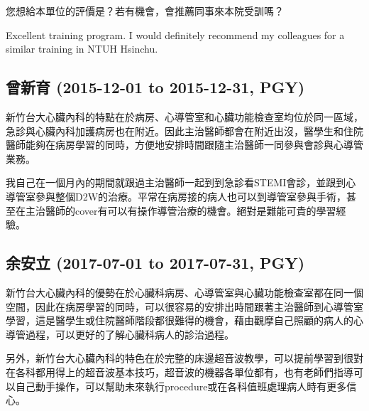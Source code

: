 \documentclass[12pt,a4paper]{article}
\begin{document}
您想給本單位的評價是？若有機會，會推薦同事來本院受訓嗎？

Excellent training program. I would definitely recommend my colleagues for a similar training in NTUH Hsinchu.


\subsection{曾新育 (2015-12-01 to 2015-12-31, PGY)}
新竹台大心臟內科的特點在於病房、心導管室和心臟功能檢查室均位於同一區域，急診與心臟內科加護病房也在附近。因此主治醫師都會在附近出沒，醫學生和住院醫師能夠在病房學習的同時，方便地安排時間跟隨主治醫師一同參與會診與心導管業務。

我自己在一個月內的期間就跟過主治醫師一起到到急診看STEMI會診，並跟到心導管室參與整個D2W的治療。平常在病房接的病人也可以到導管室參與手術，甚至在主治醫師的cover有可以有操作導管治療的機會。絕對是難能可貴的學習經驗。


\subsection{余安立 (2017-07-01 to 2017-07-31, PGY)}
新竹台大心臟內科的優勢在於心臟科病房、心導管室與心臟功能檢查室都在同一個空間，因此在病房學習的同時，可以很容易的安排出時間跟著主治醫師到心導管室學習，這是醫學生或住院醫師階段都很難得的機會，藉由觀摩自己照顧的病人的心導管過程，可以更好的了解心臟科病人的診治過程。

另外，新竹台大心臟內科的特色在於完整的床邊超音波教學，可以提前學習到很對在各科都用得上的超音波基本技巧，超音波的機器各單位都有，也有老師們指導可以自己動手操作，可以幫助未來執行procedure或在各科值班處理病人時有更多信心。



\label{LastPage}
\end{document}
